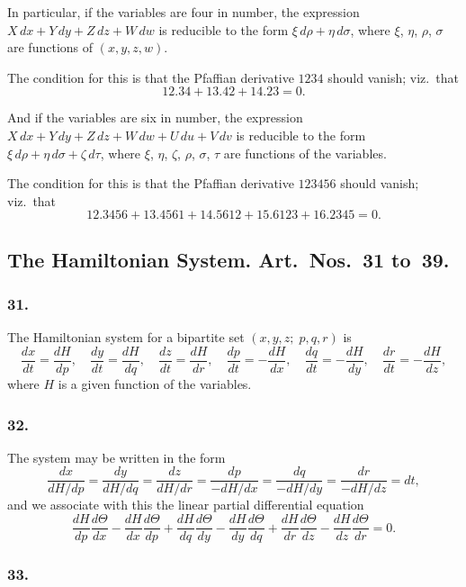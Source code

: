 \documentclass[11pt,a4paper]{book}
\begin{document}
In particular, if the variables are four in number, the expression $X\,dx + Y\,dy + Z\,dz + W\,dw$ is reducible to the form $\xi\,d\rho + \eta\,d\sigma$, where $\xi$, $\eta$, $\rho$, $\sigma$ are functions of $(x, y, z, w)$.

The condition for this is that the Pfaffian derivative $1234$ should vanish; viz.~that
\[
12.34 + 13.42 + 14.23 = 0.
\]

And if the variables are six in number, the expression $X\,dx + Y\,dy + Z\,dz + W\,dw + U\,du + V\,dv$ is reducible to the form $\xi\,d\rho + \eta\,d\sigma + \zeta\,d\tau$, where $\xi$, $\eta$, $\zeta$, $\rho$, $\sigma$, $\tau$ are functions of the variables.

The condition for this is that the Pfaffian derivative $123456$ should vanish; viz.~that
\[
12.3456 + 13.4561 + 14.5612 + 15.6123 + 16.2345 = 0.
\]

\subsection*{The Hamiltonian System. Art.~Nos.~31 to~39.}

\subsubsection*{31.}

The Hamiltonian system for a bipartite set $(x, y, z;\; p, q, r)$ is
\[
\frac{dx}{dt} = \frac{dH}{dp}, \quad \frac{dy}{dt} = \frac{dH}{dq}, \quad \frac{dz}{dt} = \frac{dH}{dr}, \quad
\frac{dp}{dt} = -\frac{dH}{dx}, \quad \frac{dq}{dt} = -\frac{dH}{dy}, \quad \frac{dr}{dt} = -\frac{dH}{dz},
\]
where $H$ is a given function of the variables.

\subsubsection*{32.}

The system may be written in the form
\[
\frac{dx}{dH/dp} = \frac{dy}{dH/dq} = \frac{dz}{dH/dr} = \frac{dp}{-dH/dx} = \frac{dq}{-dH/dy} = \frac{dr}{-dH/dz} = dt,
\]
and we associate with this the linear partial differential equation
\[
\frac{dH}{dp}\frac{d\Theta}{dx} - \frac{dH}{dx}\frac{d\Theta}{dp} + \frac{dH}{dq}\frac{d\Theta}{dy} - \frac{dH}{dy}\frac{d\Theta}{dq} + \frac{dH}{dr}\frac{d\Theta}{dz} - \frac{dH}{dz}\frac{d\Theta}{dr} = 0.
\]

\newpage
\setcounter{page}{126}

\subsubsection*{33.}
\end{document}

